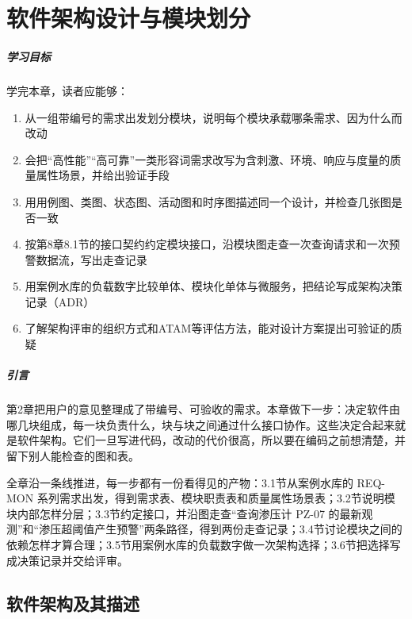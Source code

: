 \chapter{软件架构设计与模块划分}

\paragraph*{学习目标}

学完本章，读者应能够：

\begin{enumerate}
\item
  从一组带编号的需求出发划分模块，说明每个模块承载哪条需求、因为什么而改动
\item
  会把“高性能”“高可靠”一类形容词需求改写为含刺激、环境、响应与度量的质量属性场景，并给出验证手段
\item
  用用例图、类图、状态图、活动图和时序图描述同一个设计，并检查几张图是否一致
\item
  按第8章8.1节的接口契约约定模块接口，沿模块图走查一次查询请求和一次预警数据流，写出走查记录
\item
  用案例水库的负载数字比较单体、模块化单体与微服务，把结论写成架构决策记录（ADR）
\item
  了解架构评审的组织方式和ATAM等评估方法，能对设计方案提出可验证的质疑
\end{enumerate}

\paragraph*{引言}

第2章把用户的意见整理成了带编号、可验收的需求。本章做下一步：决定软件由哪几块组成，每一块负责什么，块与块之间通过什么接口协作。这些决定合起来就是软件架构。它们一旦写进代码，改动的代价很高，所以要在编码之前想清楚，并留下别人能检查的图和表。

全章沿一条线推进，每一步都有一份看得见的产物：3.1节从案例水库的 REQ-MON 系列需求出发，得到需求表、模块职责表和质量属性场景表；3.2节说明模块内部怎样分层；3.3节约定接口，并沿图走查“查询渗压计 PZ-07 的最新观测”和“渗压超阈值产生预警”两条路径，得到两份走查记录；3.4节讨论模块之间的依赖怎样才算合理；3.5节用案例水库的负载数字做一次架构选择；3.6节把选择写成决策记录并交给评审。

\section{软件架构及其描述}\label{sec:ch03-req-to-modules}

